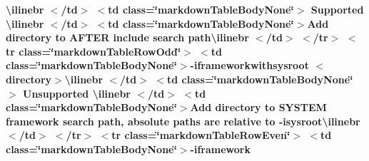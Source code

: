 \begin{longtabu}
{\bfseries{{\ttfamily \textbackslash{}ilinebr \texorpdfstring{$<$}{<}/td\texorpdfstring{$>$}{>} \texorpdfstring{$<$}{<}td class=\char`\"{}markdown\+Table\+Body\+None\char`\"{}\texorpdfstring{$>$}{>} Supported \textbackslash{}ilinebr \texorpdfstring{$<$}{<}/td\texorpdfstring{$>$}{>} \texorpdfstring{$<$}{<}td class=\char`\"{}markdown\+Table\+Body\+None\char`\"{}\texorpdfstring{$>$}{>}}Add directory to AFTER include search path{\ttfamily \textbackslash{}ilinebr \texorpdfstring{$<$}{<}/td\texorpdfstring{$>$}{>} \texorpdfstring{$<$}{<}/tr\texorpdfstring{$>$}{>} \texorpdfstring{$<$}{<}tr class=\char`\"{}markdown\+Table\+Row\+Odd\char`\"{}\texorpdfstring{$>$}{>} \texorpdfstring{$<$}{<}td class=\char`\"{}markdown\+Table\+Body\+None\char`\"{}\texorpdfstring{$>$}{>}}-\/iframeworkwithsysroot $<$directory$>${\ttfamily \textbackslash{}ilinebr \texorpdfstring{$<$}{<}/td\texorpdfstring{$>$}{>} \texorpdfstring{$<$}{<}td class=\char`\"{}markdown\+Table\+Body\+None\char`\"{}\texorpdfstring{$>$}{>} Unsupported \textbackslash{}ilinebr \texorpdfstring{$<$}{<}/td\texorpdfstring{$>$}{>} \texorpdfstring{$<$}{<}td class=\char`\"{}markdown\+Table\+Body\+None\char`\"{}\texorpdfstring{$>$}{>}}Add directory to SYSTEM framework search path, absolute paths are relative to -\/isysroot{\ttfamily \textbackslash{}ilinebr \texorpdfstring{$<$}{<}/td\texorpdfstring{$>$}{>} \texorpdfstring{$<$}{<}/tr\texorpdfstring{$>$}{>} \texorpdfstring{$<$}{<}tr class=\char`\"{}markdown\+Table\+Row\+Even\char`\"{}\texorpdfstring{$>$}{>} \texorpdfstring{$<$}{<}td class=\char`\"{}markdown\+Table\+Body\+None\char`\"{}\texorpdfstring{$>$}{>}}-\/iframework }}


\end{longtabu}
